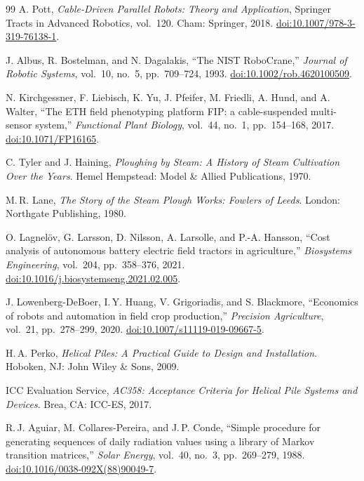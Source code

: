 \documentclass[11pt,a4paper]{article}
\begin{document}
\begin{thebibliography}{99}
A. Pott,
\emph{Cable-Driven Parallel Robots: Theory and Application},
Springer Tracts in Advanced Robotics, vol.~120. Cham: Springer, 2018.
\href{https://doi.org/10.1007/978-3-319-76138-1}{doi:10.1007/978-3-319-76138-1}.

J. Albus, R. Bostelman, and N. Dagalakis,
``The NIST RoboCrane,''
\emph{Journal of Robotic Systems}, vol.~10, no.~5, pp.~709--724, 1993.
\href{https://doi.org/10.1002/rob.4620100509}{doi:10.1002/rob.4620100509}.

N. Kirchgessner, F. Liebisch, K. Yu, J. Pfeifer, M. Friedli, A. Hund, and A. Walter,
``The ETH field phenotyping platform FIP: a cable-suspended multi-sensor system,''
\emph{Functional Plant Biology}, vol.~44, no.~1, pp.~154--168, 2017.
\href{https://doi.org/10.1071/FP16165}{doi:10.1071/FP16165}.

C. Tyler and J. Haining,
\emph{Ploughing by Steam: A History of Steam Cultivation Over the Years}.
Hemel Hempstead: Model \& Allied Publications, 1970.

M.\,R. Lane,
\emph{The Story of the Steam Plough Works: Fowlers of Leeds}.
London: Northgate Publishing, 1980.

O. Lagnel\"ov, G. Larsson, D. Nilsson, A. Larsolle, and P.-A. Hansson,
``Cost analysis of autonomous battery electric field tractors in agriculture,''
\emph{Biosystems Engineering}, vol.~204, pp.~358--376, 2021.
\href{https://doi.org/10.1016/j.biosystemseng.2021.02.005}{doi:10.1016/j.biosystemseng.2021.02.005}.

J. Lowenberg-DeBoer, I.\,Y. Huang, V. Grigoriadis, and S. Blackmore,
``Economics of robots and automation in field crop production,''
\emph{Precision Agriculture}, vol.~21, pp.~278--299, 2020.
\href{https://doi.org/10.1007/s11119-019-09667-5}{doi:10.1007/s11119-019-09667-5}.

H.\,A. Perko,
\emph{Helical Piles: A Practical Guide to Design and Installation}.
Hoboken, NJ: John Wiley \& Sons, 2009.

ICC Evaluation Service,
\emph{AC358: Acceptance Criteria for Helical Pile Systems and Devices}.
Brea, CA: ICC-ES, 2017.

R.\,J. Aguiar, M. Collares-Pereira, and J.\,P. Conde,
``Simple procedure for generating sequences of daily radiation values using a library of Markov transition matrices,''
\emph{Solar Energy}, vol.~40, no.~3, pp.~269--279, 1988.
\href{https://doi.org/10.1016/0038-092X(88)90049-7}{doi:10.1016/0038-092X(88)90049-7}.

\end{thebibliography}
\end{document}
